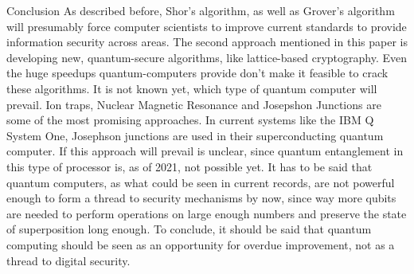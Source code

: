 \documentclass[aps,preprintnumbers,twocolumn]{revtex4}
\begin{document}
\begin{section}{Conclusion}
As described before, Shor's algorithm, 
as well as Grover's algorithm will presumably force computer scientists to improve current standards to provide information security across areas. 
The second approach mentioned in this paper is developing new, 
quantum-secure algorithms, 
like lattice-based cryptography. 
Even the huge speedups quantum-computers provide don't make it feasible to crack these algorithms. 
It is not known yet, which type of quantum computer will prevail. 
Ion traps, Nuclear Magnetic Resonance and Josepshon Junctions are some of the most promising approaches. 
In current systems like the IBM Q System One, 
Josephson junctions are used in their superconducting quantum computer. 
If this approach will prevail is unclear, 
since quantum entanglement in this type of processor is, as of 2021, not possible yet. 
It has to be said that quantum computers, 
as what could be seen in current records,  
are not powerful enough to form a thread to security mechanisms by now, 
since way more qubits are needed to perform operations on large enough numbers and preserve the state of superposition long enough. 
To conclude, it should be said that quantum computing should be seen as an opportunity for overdue improvement, not as a thread to digital security. 
\end{section}



\end{document}
